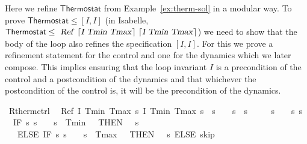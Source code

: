 \documentclass[envcountsame]{llncs}
\begin{document}
\begin{example}\label{ex:therm-rsol}
Here we refine $\mathsf{Thermostat}$ from Example~\ref{ex:therm-sol} in a modular way. To prove $\mathsf{Thermostat}\leq [I,I]$ (in Isabelle, $\mathsf{Thermostat}\leq \isa{Ref\ {\isasymlceil}I\ Tmin\ Tmax{\isasymrceil}\ {\isasymlceil}I\ Tmin\ Tmax{\isasymrceil}}$) we need to show that the body of the loop also refines the specification $[I,I]$. For this we prove a refinement statement for the control and one for the dynamics which we later compose. This implies ensuring that the loop invariant $I$ is a precondition of the control and a postcondition of the dynamics and that whichever the postcondition of the control is, it will be the precondition of the dynamics.
\begin{isabellebody}
\isanewline
{}\isamarkupfalse%
\ R{\isacharunderscore}therm{\isacharunderscore}ctrl{\isacharcolon}\isanewline
\ \ {\isachardoublequoteopen}Ref\ {\isasymlceil}I\ Tmin\ Tmax{\isasymrceil}\ {\isasymlceil}{\isasymlambda}s{\isachardot}\ I\ Tmin\ Tmax\ s\ {\isasymand}\ s{\isachardollar}{}\ {\isacharequal}\ {}\ {\isasymand}\ s{\isachardollar}{}\ {\isacharequal}\ s{\isachardollar}{}{\isasymrceil}\ {\isasymge}\isanewline
\ \ {\isacharparenleft}{}\ {\isacharcolon}{\isacharcolon}{\isacharequal}\ {\isacharparenleft}{\isasymlambda}s{\isachardot}\ {}{\isacharparenright}{\isacharparenright}{\isacharsemicolon}\ {\isacharparenleft}{}\ {\isacharcolon}{\isacharcolon}{\isacharequal}\ {\isacharparenleft}{\isasymlambda}s{\isachardot}\ s{\isachardollar}{}{\isacharparenright}{\isacharparenright}{\isacharsemicolon}\isanewline
\ \ {\isacharparenleft}IF\ {\isacharparenleft}{\isasymlambda}s{\isachardot}\ s{\isachardollar}{}\ {\isacharequal}\ {}\ {\isasymand}\ s{\isachardollar}{}\ {\isasymle}\ Tmin\ {\isacharplus}\ {}{\isacharparenright}\ THEN\ {\isacharparenleft}{}\ {\isacharcolon}{\isacharcolon}{\isacharequal}\ {\isacharparenleft}{\isasymlambda}s{\isachardot}{}{\isacharparenright}{\isacharparenright}\ \isanewline
\ \ \ ELSE\ IF\ {\isacharparenleft}{\isasymlambda}s{\isachardot}\ s{\isachardollar}{}\ {\isacharequal}\ {}\ {\isasymand}\ s{\isachardollar}{}\ {\isasymge}\ Tmax\ {\isacharminus}\ {}{\isacharparenright}\ THEN\ {\isacharparenleft}{}\ {\isacharcolon}{\isacharcolon}{\isacharequal}\ {\isacharparenleft}{\isasymlambda}s{\isachardot}{}{\isacharparenright}{\isacharparenright}\ ELSE\ skip{\isacharparenright}{\isachardoublequoteclose}\isanewline

\end{isabellebody}
\end{example}
\end{document}
